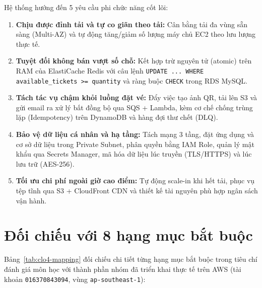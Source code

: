 Hệ thống hướng đến 5 yêu cầu phi chức năng cốt lõi:
\begin{enumerate}[leftmargin=1.5em]
  \item \textbf{Chịu được đỉnh tải và tự co giãn theo tải:} Cân bằng tải đa vùng sẵn sàng (Multi-AZ) và tự động tăng/giảm số lượng máy chủ EC2 theo lưu lượng thực tế.
  \item \textbf{Tuyệt đối không bán vượt số chỗ:} Kết hợp trừ nguyên tử (atomic) trên RAM của ElastiCache Redis với câu lệnh \texttt{UPDATE ... WHERE available\_tickets >= quantity} và ràng buộc \texttt{CHECK} trong RDS MySQL.
  \item \textbf{Tách tác vụ chậm khỏi luồng đặt vé:} Đẩy việc tạo ảnh QR, tải lên S3 và gửi email ra xử lý bất đồng bộ qua SQS + Lambda, kèm cơ chế chống trùng lặp (Idempotency) trên DynamoDB và hàng đợi thư chết (DLQ).
  \item \textbf{Bảo vệ dữ liệu cá nhân và hạ tầng:} Tách mạng 3 tầng, đặt ứng dụng và cơ sở dữ liệu trong Private Subnet, phân quyền bằng IAM Role, quản lý mật khẩu qua Secrets Manager, mã hóa dữ liệu lúc truyền (TLS/HTTPS) và lúc lưu trữ (AES-256).
  \item \textbf{Tối ưu chi phí ngoài giờ cao điểm:} Tự động scale-in khi hết tải, phục vụ tệp tĩnh qua S3 + CloudFront CDN và thiết kế tài nguyên phù hợp ngân sách vận hành.
\end{enumerate}

\section{Đối chiếu với 8 hạng mục bắt buộc}
Bảng~\ref{tab:clo4-mapping} đối chiếu chi tiết từng hạng mục bắt buộc trong tiêu chí đánh giá môn học với thành phần nhóm đã triển khai thực tế trên AWS (tài khoản \texttt{016370843094}, vùng \texttt{ap-southeast-1}):

